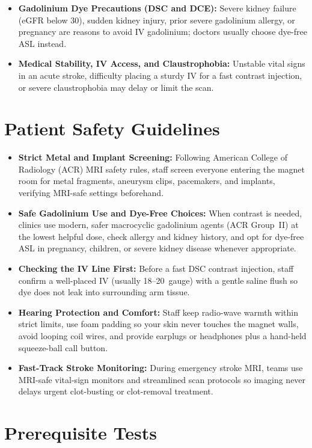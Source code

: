 \begin{itemize}
    \item \textbf{Gadolinium Dye Precautions (DSC and DCE):} Severe kidney failure (eGFR below 30), sudden kidney injury, prior severe gadolinium allergy, or pregnancy are reasons to avoid IV gadolinium; doctors usually choose dye-free ASL instead.
    \item \textbf{Medical Stability, IV Access, and Claustrophobia:} Unstable vital signs in an acute stroke, difficulty placing a sturdy IV for a fast contrast injection, or severe claustrophobia may delay or limit the scan.
\end{itemize}

\section{Patient Safety Guidelines}

\begin{itemize}
    \item \textbf{Strict Metal and Implant Screening:} Following American College of Radiology (ACR) MRI safety rules, staff screen everyone entering the magnet room for metal fragments, aneurysm clips, pacemakers, and implants, verifying MRI-safe settings beforehand.
    \item \textbf{Safe Gadolinium Use and Dye-Free Choices:} When contrast is needed, clinics use modern, safer macrocyclic gadolinium agents (ACR Group~II) at the lowest helpful dose, check allergy and kidney history, and opt for dye-free ASL in pregnancy, children, or severe kidney disease whenever appropriate.
    \item \textbf{Checking the IV Line First:} Before a fast DSC contrast injection, staff confirm a well-placed IV (usually 18--20~gauge) with a gentle saline flush so dye does not leak into surrounding arm tissue.
    \item \textbf{Hearing Protection and Comfort:} Staff keep radio-wave warmth within strict limits, use foam padding so your skin never touches the magnet walls, avoid looping coil wires, and provide earplugs or headphones plus a hand-held squeeze-ball call button.
    \item \textbf{Fast-Track Stroke Monitoring:} During emergency stroke MRI, teams use MRI-safe vital-sign monitors and streamlined scan protocols so imaging never delays urgent clot-busting or clot-removal treatment.
\end{itemize}

\section{Prerequisite Tests}

